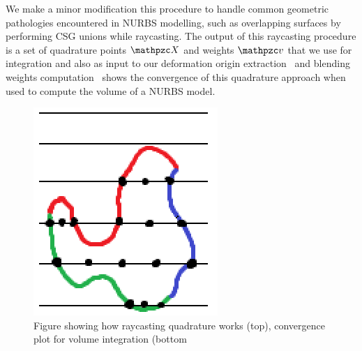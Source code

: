 We make a minor modification this procedure to handle common geometric pathologies encountered in NURBS modelling, such as overlapping surfaces by performing 
CSG unions while raycasting. 
The output of this raycasting procedure is a set of quadrature points $\st{X}$ and weights $\st{v}$ that we use for integration and also as input to our 
deformation origin extraction~ and blending weights computation~
 shows the convergence of this quadrature approach when used to compute the volume of a NURBS model.
\begin{figure}
    \includegraphics[width=\columnwidth]{figures/raycasting_quadrature}
    \caption{Figure showing how raycasting quadrature works (top), convergence plot for volume integration (bottom}
    \label{fig:raycasting}
\end{figure}

